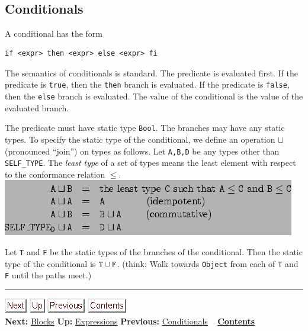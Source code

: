 \documentclass[]{article}
\begin{document}
\subsection{\\ Conditionals}

A conditional has the form

\begin{verbatim}
if <expr> then <expr> else <expr> fi
\end{verbatim}

The semantics of conditionals is standard. The predicate is evaluated
first. If the predicate is \texttt{true}, then the \texttt{then} branch
is evaluated. If the predicate is \texttt{false}, then the \texttt{else}
branch is evaluated. The value of the conditional is the value of the
evaluated branch.

The predicate must have static type \texttt{Bool}. The branches may have
any static types. To specify the static type of the conditional, we
define an operation $\sqcup$ (pronounced ``join'') on types as follows.
Let \texttt{A,B,D} be any types other than \texttt{SELF\_TYPE}. The
\emph{least type} of a set of types means the least element with respect
to the conformance relation $\leq$. \\

\includegraphics{img23.png}

Let \texttt{T} and \texttt{F} be the static types of the branches of the
conditional. Then the static type of the conditional is
$\tt T \sqcup F$. (think: Walk towards \texttt{Object} from each of
\texttt{T} and \texttt{F} until the paths meet.)

\begin{center}\rule{3in}{0.4pt}\end{center}

\href{node20.html}{\includegraphics{next.png}}
\href{node13.html}{\includegraphics{up.png}}
\href{node18.html}{\includegraphics{prev.png}}
\href{node1.html}{\includegraphics{contents.png}} \\ \textbf{Next:}
\href{node20.html}{Blocks} \textbf{Up:} \href{node13.html}{Expressions}
\textbf{Previous:} \href{node18.html}{Conditionals} ~
\textbf{\href{node1.html}{Contents}} \\ \\
\end{document}
